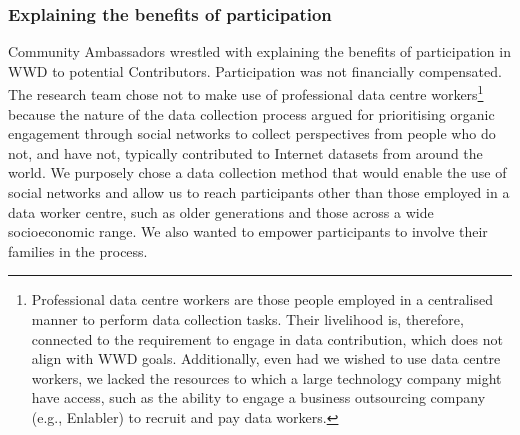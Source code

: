 \subsubsection{Explaining the benefits of participation}

Community Ambassadors wrestled with explaining the benefits of participation in \textsc{WWD} to potential Contributors. Participation was not financially compensated. The research team chose not to make use of professional data centre workers\footnote{Professional data centre workers are those people employed in a centralised manner to perform data collection tasks. Their livelihood is, therefore, connected to the requirement to engage in data contribution, which does not align with \textsc{WWD} goals. Additionally, even had we wished to use data centre workers, we lacked the resources to which a large technology company might have access, such as the ability to engage a business outsourcing company (e.g., Enlabler) to recruit and pay data workers.} because the nature of the data collection process argued for prioritising organic engagement through social networks to collect perspectives from people who do not, and have not, typically contributed to Internet datasets from around the world. We purposely chose a data collection method that would enable the use of social networks and allow us to reach participants other than those employed in a data worker centre, such as older generations and those across a wide socioeconomic range. We also wanted to empower participants to involve their families in the process. 

